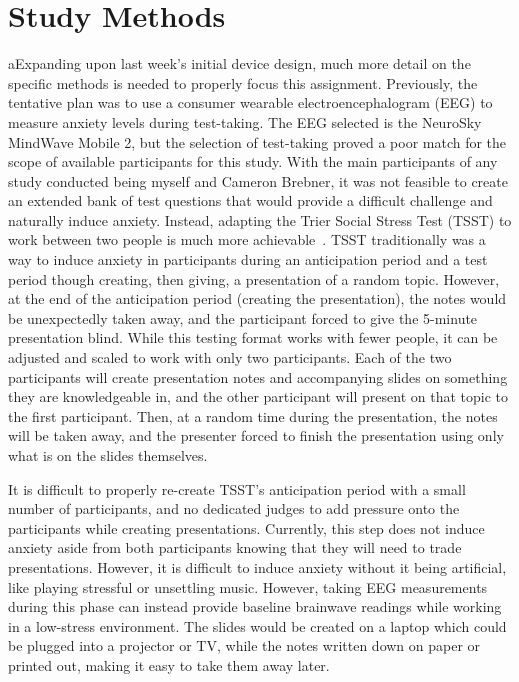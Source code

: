 \documentclass[journal]{IEEEtran}
\begin{document}

\section{Study Methods}
aExpanding upon last week's initial device design, much more detail on the specific methods is needed to properly focus this assignment. Previously, the tentative plan was to use a consumer wearable electroencephalogram (EEG) to measure anxiety levels during test-taking. The EEG selected is the NeuroSky MindWave Mobile 2, but the selection of test-taking proved a poor match for the scope of available participants for this study. With the main participants of any study conducted being myself and Cameron Brebner, it was not feasible to create an extended bank of test questions that would provide a difficult challenge and naturally induce anxiety. Instead, adapting the Trier Social Stress Test (TSST) to work between two people is much more achievable~\cite{kirschbaum_pirke_hellhammer_1993}. TSST traditionally was a way to induce anxiety in participants during an anticipation period and a test period though creating, then giving, a presentation of a random topic. However, at the end of the anticipation period (creating the presentation), the notes would be unexpectedly taken away, and the participant forced to give the 5-minute presentation blind. While this testing format works with fewer people, it can be adjusted and scaled to work with only two participants. Each of the two participants will create presentation notes and accompanying slides on something they are knowledgeable in, and the other participant will present on that topic to the first participant. Then, at a random time during the presentation, the notes will be taken away, and the presenter forced to finish the presentation using only what is on the slides themselves.

It is difficult to properly re-create TSST's anticipation period with a small number of participants, and no dedicated judges to add pressure onto the participants while creating presentations. Currently, this step does not induce anxiety aside from both participants knowing that they will need to trade presentations. However, it is difficult to induce anxiety without it being artificial, like playing stressful or unsettling music. However, taking EEG measurements during this phase can instead provide baseline brainwave readings while working in a low-stress environment. The slides would be created on a laptop which could be plugged into a projector or TV, while the notes written down on paper or printed out, making it easy to take them away later.
\end{document}
